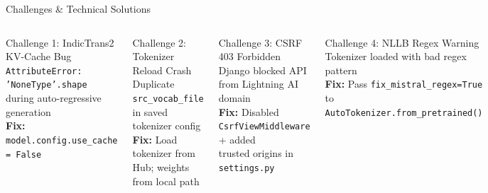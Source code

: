 \documentclass[aspectratio=169]{beamer}
\begin{document}
\begin{frame}{Challenges \& Technical Solutions}
\begin{columns}[T]
    \begin{alertblock}{Challenge 1: IndicTrans2 KV-Cache Bug}
      \texttt{AttributeError: 'NoneType'.shape}\\during auto-regressive generation\\
      \textbf{Fix:} \texttt{model.config.use\_cache = False}
    \end{alertblock}
    \vspace{0.4em}
    \begin{alertblock}{Challenge 2: Tokenizer Reload Crash}
      Duplicate \texttt{src\_vocab\_file} in saved tokenizer config\\
      \textbf{Fix:} Load tokenizer from Hub; weights from local path
    \end{alertblock}
    \begin{alertblock}{Challenge 3: CSRF 403 Forbidden}
      Django blocked API from Lightning AI domain\\
      \textbf{Fix:} Disabled \texttt{CsrfViewMiddleware} + added\\trusted origins in \texttt{settings.py}
    \end{alertblock}
    \vspace{0.4em}
    \begin{block}{Challenge 4: NLLB Regex Warning}
      Tokenizer loaded with bad regex pattern\\
      \textbf{Fix:} Pass \texttt{fix\_mistral\_regex=True}\\to \texttt{AutoTokenizer.from\_pretrained()}
    \end{block}
\end{columns}
\end{frame}
\end{document}
